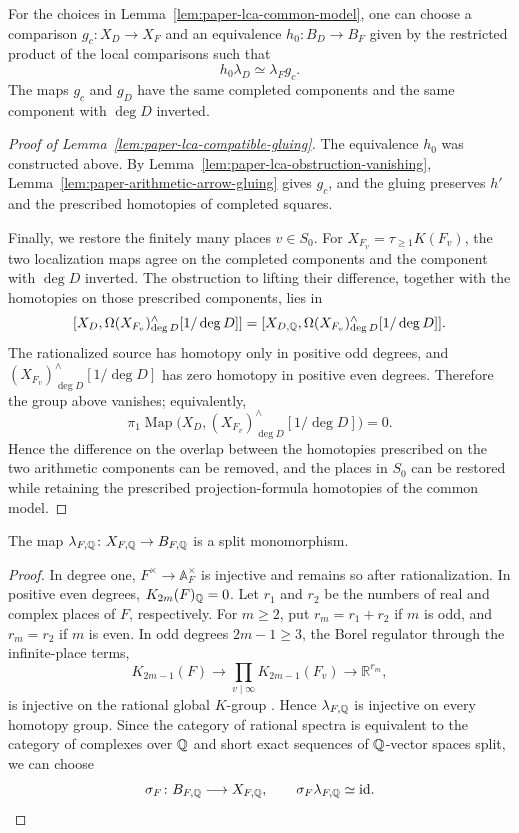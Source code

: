 \begin{lemma}
\label{lem:paper-lca-compatible-gluing}
For the choices in Lemma~\ref{lem:paper-lca-common-model}, one can choose a comparison $g_c\colon X_D\to X_F$ and an equivalence $h_0\colon B_D\to B_F$ given by the restricted product of the local comparisons such that
\[
 h_0\lambda_D\simeq\lambda_Fg_c.
\]
The maps $g_c$ and $g_D$ have the same completed components and the same component with $\deg D$ inverted.
\end{lemma}
\begin{proof}[Proof of Lemma~\ref{lem:paper-lca-compatible-gluing}]
The equivalence $h_0$ was constructed above.
By Lemma~\ref{lem:paper-lca-obstruction-vanishing}, Lemma~\ref{lem:paper-arithmetic-arrow-gluing} gives $g_c$, and the gluing preserves $h'$ and the prescribed homotopies of completed squares.

Finally, we restore the finitely many places $v\in S_0$.
For $X_{F_v}=\tau_{\ge1}K(F_v)$, the two localization maps agree on the completed components and the component with $\deg D$ inverted.
The obstruction to lifting their difference, together with the homotopies on those prescribed components, lies in
\[
 [X_D,\Omega (X_{F_v})^\wedge_{\deg D}[1/\deg D]]=[X_{D,\mathbb Q},\Omega (X_{F_v})^\wedge_{\deg D}[1/\deg D]].
\]
The rationalized source has homotopy only in positive odd degrees, and $(X_{F_v})^\wedge_{\deg D}[1/\deg D]$ has zero homotopy in positive even degrees.
Therefore the group above vanishes; equivalently,
\[
 \pi_1\operatorname{Map}\bigl(X_D,(X_{F_v})^\wedge_{\deg D}[1/\deg D]\bigr)=0.
\]
Hence the difference on the overlap between the homotopies prescribed on the two arithmetic components can be removed, and the places in $S_0$ can be restored while retaining the prescribed projection-formula homotopies of the common model.
\end{proof}

\begin{lemma}\label{lem:paper-lca-regulator-retract}
The map $\lambda_{F,\mathbb Q}\colon X_{F,\mathbb Q}\to B_{F,\mathbb Q}$ is a split monomorphism.
\end{lemma}
\begin{proof}
In degree one, $F^\times\to\mathbb A_F^\times$ is injective and remains so after rationalization.
In positive even degrees, $K_{2m}(F)_\mathbb Q=0$.
Let $r_1$ and $r_2$ be the numbers of real and complex places of $F$, respectively.
For $m\ge2$, put $r_m=r_1+r_2$ if $m$ is odd, and $r_m=r_2$ if $m$ is even.
In odd degrees $2m-1\ge3$, the Borel regulator through the infinite-place terms,
\[
 K_{2m-1}(F)\longrightarrow
 \prod_{v\mid\infty}K_{2m-1}(F_v)\longrightarrow\mathbb R^{r_m},
\]
is injective on the rational global $K$-group \cite{Borel}.
Hence $\lambda_{F,\mathbb Q}$ is injective on every homotopy group.
Since the category of rational spectra is equivalent to the category of complexes over $\mathbb Q$ and short exact sequences of $\mathbb Q$-vector spaces split, we can choose
\[
 \sigma_F\colon B_{F,\mathbb Q}\longrightarrow X_{F,\mathbb Q},\qquad
 \sigma_F\lambda_{F,\mathbb Q}\simeq\mathrm{id}.
\]
\end{proof}


